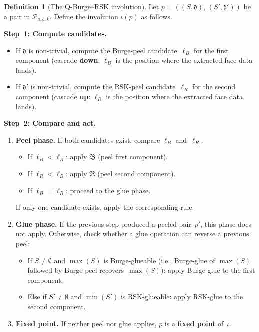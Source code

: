 \documentclass[11pt]{article}
\theoremstyle{plain}
\theoremstyle{definition}
\newtheorem{definition}[theorem]{Definition}
\begin{document}
\begin{definition}[The Q-Burge--RSK involution]
\label{def:Q-BR-involution}
Let $p = ((S, \mathfrak{d}),\, (S', \mathfrak{d}'))$ be a
pair in $\mathcal{P}_{a,b,k}$.  Define the involution
$\iota(p)$ as follows.

\medskip
\noindent\textbf{Step~1: Compute candidates.}
\begin{itemize}
  \item If $\mathfrak{d}$ is non-trivial, compute the
    Burge-peel candidate~$\ell_B$ for the first component
    (cascade \textbf{down}: $\ell_B$ is the position where the
    extracted face data lands).
  \item If $\mathfrak{d}'$ is non-trivial, compute the
    RSK-peel candidate~$\ell_R$ for the second component
    (cascade \textbf{up}: $\ell_R$ is the position where the
    extracted face data lands).
\end{itemize}

\medskip
\noindent\textbf{Step~2: Compare and act.}
\begin{enumerate}
  \item[(P)] \textbf{Peel phase.}\; If both candidates exist,
    compare $\ell_B$ and~$\ell_R$.
    \begin{itemize}
      \item If $\ell_B < \ell_R$: apply $\mathfrak{B}$ (peel
        first component).
      \item If $\ell_R < \ell_B$: apply $\mathfrak{R}$ (peel
        second component).
      \item If $\ell_B = \ell_R$: proceed to the glue phase.
    \end{itemize}
    If only one candidate exists, apply the corresponding rule.

  \item[(G)] \textbf{Glue phase.}\; If the previous step
    produced a peeled pair~$p'$, this phase does not apply.
    Otherwise, check whether a glue operation can reverse a
    previous peel:
    \begin{itemize}
      \item If $S \neq \emptyset$ and $\max(S)$ is
        Burge-glueable (i.e., Burge-glue of $\max(S)$
        followed by Burge-peel recovers~$\max(S)$): apply
        Burge-glue to the first component.
      \item Else if $S' \neq \emptyset$ and $\min(S')$ is
        RSK-glueable: apply RSK-glue to the second component.
    \end{itemize}

  \item[(F)] \textbf{Fixed point.}\; If neither peel nor glue
    applies, $p$ is a \textbf{fixed point} of~$\iota$.
\end{enumerate}
\end{definition}
\end{document}
